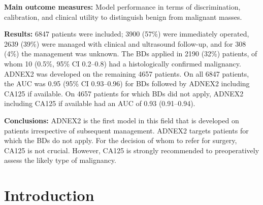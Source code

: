 \noindent\textbf{Main outcome measures:} Model performance in terms of discrimination, calibration, and clinical utility to distinguish benign from malignant masses.

\noindent\textbf{Results:} 6847 patients were included; 3900 (57\%) were immediately operated, 2639 (39\%) were managed with clinical and ultrasound follow-up, and for 308 (4\%) the management was unknown. The \glspl{BD} applied in 2190 (32\%) patients, of whom 10 (0.5\%, 95\% \gls{CI} 0.2--0.8) had a histologically confirmed malignancy. ADNEX2 was developed on the remaining 4657 patients. On all 6847 patients, the \gls{AUC} was 0.95 (95\% \gls{CI} 0.93--0.96) for \glspl{BD} followed by ADNEX2 including \gls{CA125} if available. On 4657 patients for which \glspl{BD} did not apply, ADNEX2 including \gls{CA125} if available had an \gls{AUC} of 0.93 (0.91--0.94).

\noindent\textbf{Conclusions:} ADNEX2 is the first model in this field that is developed on patients irrespective of subsequent management. ADNEX2 targets patients for which the \glspl{BD} do not apply. For the decision of whom to refer for surgery, \gls{CA125} is not crucial. However, \gls{CA125} is strongly recommended to preoperatively assess the likely type of malignancy.

\vspace{0.5cm}

\newpage

\section{Introduction}


